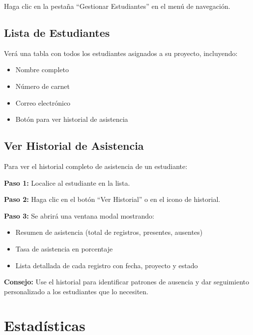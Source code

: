 \documentclass[11pt,a4paper]{article}
\begin{document}
Haga clic en la pestaña ``Gestionar Estudiantes'' en el menú de navegación.

\subsection{Lista de Estudiantes}

Verá una tabla con todos los estudiantes asignados a su proyecto, incluyendo:

\begin{itemize}
  \item Nombre completo
  \item Número de carnet
  \item Correo electrónico
  \item Botón para ver historial de asistencia
\end{itemize}

\subsection{Ver Historial de Asistencia}

Para ver el historial completo de asistencia de un estudiante:

\textbf{Paso 1:} Localice al estudiante en la lista.

\textbf{Paso 2:} Haga clic en el botón ``Ver Historial'' o en el icono de historial.

\textbf{Paso 3:} Se abrirá una ventana modal mostrando:
\begin{itemize}
  \item Resumen de asistencia (total de registros, presentes, ausentes)
  \item Tasa de asistencia en porcentaje
  \item Lista detallada de cada registro con fecha, proyecto y estado
\end{itemize}

\begin{tipbox}
\textbf{Consejo:} Use el historial para identificar patrones de ausencia y dar seguimiento personalizado a los estudiantes que lo necesiten.
\end{tipbox}

\section{Estadísticas}
\end{document}
